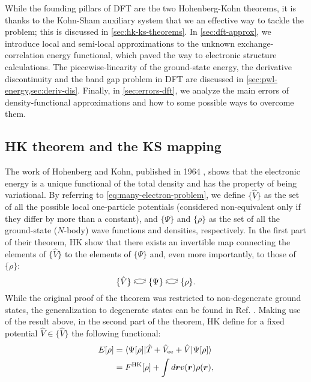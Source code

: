 While the founding pillars of DFT are the two Hohenberg-Kohn theorems, it is thanks to the Kohn-Sham auxiliary system that we an effective way to tackle the problem; this is discussed in \cref{sec:hk-ks-theorems}. In \cref{sec:dft-approx}, we introduce local and semi-local approximations to the unknown exchange-correlation energy functional, which paved the way to electronic structure calculations. The piecewise-linearity of the ground-state energy, the derivative discontinuity and the band gap problem in DFT are discussed in \cref{sec:pwl-energy,sec:deriv-dis}. Finally, in \cref{sec:errors-dft}, we analyze the main errors of density-functional approximations and how to some possible ways to overcome them.

\subsection{HK theorem and the KS mapping\label{sec:hk-ks-theorems}}
The work of Hohenberg and Kohn, published in 1964 \cite{hohenberg_inhomogeneous_1964}, shows that the electronic energy is a unique functional of the total density and has the property of being variational. By referring to \cref{eq:many-electron-problem}, we define $\{ \hat{V} \}$ as the set of all the possible local one-particle potentials (considered non-equivalent only if they differ by more than a constant), and $\{ \Psi \}$ and $\{ \rho \}$ as the set of all the ground-state ($N$-body) wave functions and densities, respectively. In the first part of their theorem, HK show that there exists an invertible map connecting the elements of $\{ \hat{V} \}$ to the elements of $\{ \Psi \}$ and, even more importantly, to those of $\{ \rho \}$:
%
\begin{equation}
    \{ \hat{V} \} \curvedrightleft \{ \Psi \} \curvedrightleft \{ \rho \} .
    \label{eq:hk-theorem}
\end{equation}
%
While the original proof of the theorem was restricted to non-degenerate ground states, the generalization to degenerate states can be found in Ref. \cite{dreizler_density_1990}. Making use of the result above, in the second part of the theorem, HK define for a fixed potential $\hat{V} \in \{ \hat{V} \}$ the following functional:
%
\begin{equation}
\begin{split}
    E[\rho] &= \braket{\Psi[\rho]|\hat{T} + \hat{V}_{\rm ee} + \hat{V}|\Psi[\rho]} \\
    &= F^{\rm HK}[\rho] + \int d{\bm r} v({\bm r}) \rho({\bm r}) ,
\end{split}
\label{eq:hk-functional}
\end{equation}
